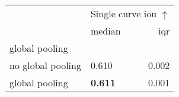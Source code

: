 \begin{tabular}{llr}
\toprule
 & \multicolumn{2}{c}{Single curve \acrshort{iou} $\uparrow$} \\
 & median & \acrshort{iqr} \\
global pooling &  &  \\
\midrule
no global pooling & 0.610 & 0.002 \\
global pooling & \textbf{0.611} & 0.001 \\
\bottomrule
\end{tabular}
